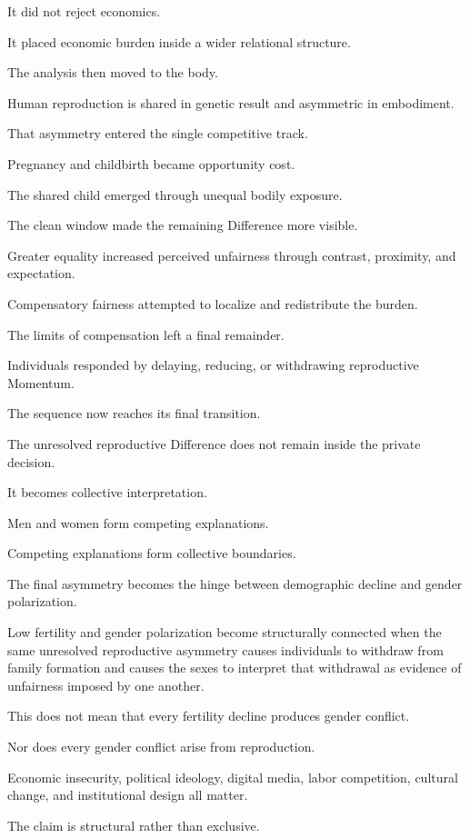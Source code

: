 It did not reject economics.

It placed economic burden inside a wider relational structure.

The analysis then moved to the body.

Human reproduction is shared in genetic result and asymmetric in embodiment.

That asymmetry entered the single competitive track.

Pregnancy and childbirth became opportunity cost.

The shared child emerged through unequal bodily exposure.

The clean window made the remaining Difference more visible.

Greater equality increased perceived unfairness through contrast, proximity, and expectation.

Compensatory fairness attempted to localize and redistribute the burden.

The limits of compensation left a final remainder.

Individuals responded by delaying, reducing, or withdrawing reproductive Momentum.

The sequence now reaches its final transition.

The unresolved reproductive Difference does not remain inside the private decision.

It becomes collective interpretation.

Men and women form competing explanations.

Competing explanations form collective boundaries.

The final asymmetry becomes the hinge between demographic decline and gender polarization.

Low fertility and gender polarization become structurally connected when the same unresolved reproductive asymmetry causes individuals to withdraw from family formation and causes the sexes to interpret that withdrawal as evidence of unfairness imposed by one another.

This does not mean that every fertility decline produces gender conflict.

Nor does every gender conflict arise from reproduction.

Economic insecurity, political ideology, digital media, labor competition, cultural change, and institutional design all matter.

The claim is structural rather than exclusive.

